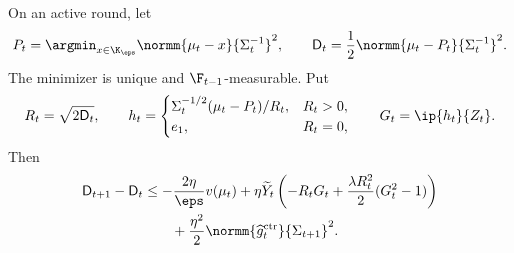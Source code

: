 \begin{lemma}
    \label{lem:ctr-distance-recursion}
    On an active round, let
    \begin{align}
        P_t
        =\argmin_{x\in\K_\eps}
        \normm{\mu_t-x}{\Sigma_t^{-1}}^2,
        \qquad
        \mathsf D_t
        =\frac12\normm{\mu_t-P_t}{\Sigma_t^{-1}}^2.
    \end{align}
    The minimizer is unique and $\F_{t-1}$-measurable.  Put
    \begin{align}
        R_t=\sqrt{2\mathsf D_t},
        \qquad
        h_t=
        \begin{cases}
            \Sigma_t^{-1/2}(\mu_t-P_t)/R_t, & R_t>0, \\
            e_1,                            & R_t=0,
        \end{cases}
        \qquad
        G_t=\ip{h_t}{Z_t}.
    \end{align}
    Then
    \begin{align}
        \mathsf D_{t+1}-\mathsf D_t
         & \leq
        -\frac{2\eta}{\eps}v(\mu_t)
        +\eta\widetilde Y_t
        \left(
        -R_tG_t
        +\frac{\lambda R_t^2}{2}(G_t^2-1)
        \right)
        \nonumber \\
         & \qquad
        +\frac{\eta^2}{2}
        \normm{\widehat g_t^{\mathrm{ctr}}}{\Sigma_{t+1}}^2.
        \label{eq:ctr-distance-recursion}
    \end{align}
\end{lemma}

